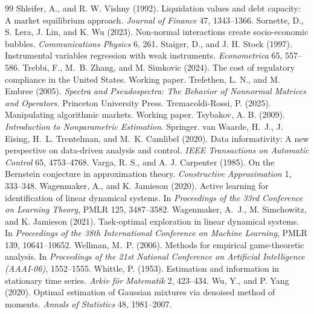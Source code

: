 \documentclass[12pt]{article}
\theoremstyle{definition}
\theoremstyle{remark}
\begin{document}
\begin{thebibliography}{99}
 Shleifer, A., and R. W. Vishny (1992). Liquidation values and debt capacity: A market equilibrium approach. \emph{Journal of Finance} 47, 1343--1366.
 Sornette, D., S. Lera, J. Lin, and K. Wu (2023). Non-normal interactions create socio-economic bubbles. \emph{Communications Physics} 6, 261.
 Staiger, D., and J. H. Stock (1997). Instrumental variables regression with weak instruments. \emph{Econometrica} 65, 557--586.
 Trebbi, F., M.~B. Zhang, and M. Simkovic (2024). The cost of regulatory compliance in the United States. Working paper.
 Trefethen, L. N., and M. Embree (2005). \emph{Spectra and Pseudospectra: The Behavior of Nonnormal Matrices and Operators}. Princeton University Press.
 Tremacoldi-Rossi, P. (2025). Manipulating algorithmic markets. Working paper.
 Tsybakov, A. B. (2009). \emph{Introduction to Nonparametric Estimation}. Springer.
 van Waarde, H.~J., J. Eising, H.~L. Trentelman, and M.~K. Camlibel (2020). Data informativity: A new perspective on data-driven analysis and control. \emph{IEEE Transactions on Automatic Control} 65, 4753--4768.
 Varga, R. S., and A. J. Carpenter (1985). On the Bernstein conjecture in approximation theory. \emph{Constructive Approximation} 1, 333--348.
 Wagenmaker, A., and K. Jamieson (2020). Active learning for identification of linear dynamical systems. In \emph{Proceedings of the 33rd Conference on Learning Theory}, PMLR 125, 3487--3582.
 Wagenmaker, A.~J., M. Simchowitz, and K. Jamieson (2021). Task-optimal exploration in linear dynamical systems. In \emph{Proceedings of the 38th International Conference on Machine Learning}, PMLR 139, 10641--10652.
 Wellman, M.~P. (2006). Methods for empirical game-theoretic analysis. In \emph{Proceedings of the 21st National Conference on Artificial Intelligence (AAAI-06)}, 1552--1555.
 Whittle, P. (1953). Estimation and information in stationary time series. \emph{Arkiv f\"or Matematik} 2, 423--434.
 Wu, Y., and P. Yang (2020). Optimal estimation of Gaussian mixtures via denoised method of moments. \emph{Annals of Statistics} 48, 1981--2007.
\end{thebibliography}
\end{document}
